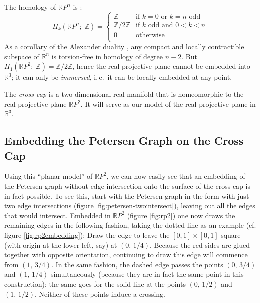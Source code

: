 \documentclass[11pt,            %
               a4paper,         %
               oneside,         %
               DIV12,           %
               fleqn,           %
               halfparskip,     %
               nochapterprefix, %
              ]{scrartcl} %
\theoremstyle{definition}
\begin{document}
The homology of $\mathbb{R}P^n$ is \cite[2.42]{hatcher}:
\[
  H_k(\mathbb{R}P^n;\;\mathbb{Z}) =
                   \begin{cases}
                      \mathbb{Z} & \text{if }k = 0\text{ or }k = n\text{ odd} \\
                      \mathbb{Z}/2\mathbb{Z} & \text{if $k$ odd and } 0 < k < n \\
                      0 & \text{otherwise} \\
                   \end{cases}
\]
As a corollary of the Alexander duality \cite[3.45]{hatcher}, any compact and locally
contractible subspace of $\mathbb{R}^n$ is torsion-free in homology of
degree $n-2$. But $H_1(\mathbb{R}P^2;\;\mathbb{Z}) = \mathbb{Z}/2\mathbb{Z}$, hence
the real projective plane cannot be embedded into $\mathbb{R}^3$; it
can only be \emph{immersed}, i.\,e.~it can be locally embedded at any
point.

The \emph{cross cap} is a two-dimensional real manifold that is
homeomorphic to the real projective plane $\mathbb{R}P^2$. It will
serve as our model of the real projective plane in $\mathbb{R}^3$.

\subsection{Embedding the Petersen Graph on the Cross Cap}
\label{sec:rp2embedding}

Using this “planar model” of $\mathbb{R}P^2$, we can now easily see
that an embedding of the Petersen graph without edge intersection onto
the surface of the cross cap is in fact possible.
To see this, start with the Petersen graph in the form with just two
edge intersections (figure \ref{fig:petersen-twointersect}), leaving
out all the edges that would intersect.
Embedded in $\mathbb{R}P^2$ (figure \ref{fig:rp2}) one now draws the
remaining edges in the following fashion, taking the dotted line as an
example (cf. figure \ref{fig:rp2embedding}):
Draw the edge to leave the $[0,1]\times[0,1]$ square (with origin at
the lower left, say) at $(0,\,1/4)$.
Because the red sides are glued together with opposite orientation,
continuing to draw this edge will commence from $(1,\,3/4)$.
In the same fashion, the dashed edge passes the points $(0,\,3/4)$ and
$(1,\,1/4)$ simultaneously (because they are in fact the same point in
this construction); the same goes for the solid line at the points
$(0,\,1/2)$ and $(1,\,1/2)$.
Neither of these points induce a crossing.
\end{document}
